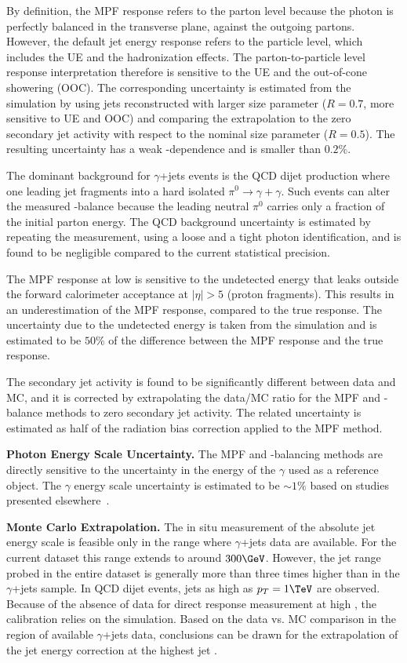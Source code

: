By definition, the MPF response refers to the parton level because the photon is perfectly balanced in the transverse plane, against the outgoing partons. However, the default jet energy response refers to the particle level, which includes the UE and the hadronization effects. The parton-to-particle level response interpretation therefore is sensitive to the UE and the out-of-cone showering (OOC). The corresponding uncertainty is estimated from the simulation by using jets reconstructed with larger size parameter ($R=0.7$, more sensitive to UE and OOC) and comparing the extrapolation to the zero secondary jet activity with respect to the nominal size parameter ($R=0.5$). The resulting uncertainty has a weak \pt-dependence and is smaller than $0.2\%$. 

The dominant background for $\gamma$+jets events is the QCD dijet production where one leading jet fragments into a hard isolated $\pi^0\to\gamma+\gamma$. Such events can alter the measured \pt-balance because the leading neutral $\pi^0$ carries only a fraction of the initial parton energy. The QCD background uncertainty is estimated by repeating the measurement, using a loose and a tight photon identification, and is found to be negligible compared to the current statistical precision.

The MPF response at low \pt is sensitive to the undetected energy that leaks outside the forward calorimeter acceptance at $|\eta|>5$ (proton fragments). This results in an underestimation of the MPF response, compared to the true response. The uncertainty due to the undetected energy is taken from the simulation and is estimated to be $50\%$ of the difference between the MPF response and the true response. 

The secondary jet activity is found to be significantly different between data and MC, and it is corrected by extrapolating the data/MC ratio for the MPF and \pt-balance methods to zero secondary jet activity. The related uncertainty is estimated as half of the radiation bias correction applied to the MPF method.

{\bf Photon Energy Scale Uncertainty.} The MPF and \pt-balancing methods are directly sensitive to the uncertainty in the energy of the $\gamma$ used as a reference object. The $\gamma$ energy scale uncertainty is estimated to be $\sim 1\%$ based on studies presented elsewhere~\cite{EGM-10-003}.

{\bf Monte Carlo Extrapolation.} The in situ measurement of the absolute jet energy scale is feasible only in the \pt range where $\gamma$+jets data are available. For the current dataset this range extends to around $300\GeV$. However, the jet \pt range probed in the entire dataset is generally more than three times higher than in the $\gamma$+jets sample. In QCD dijet events, jets as high as $\pt = 1\TeV$ are observed. Because of the absence of data for direct response measurement at high \pt, the calibration relies on the simulation. Based on the data vs. MC comparison in the region of available $\gamma$+jets data, conclusions can be drawn for the extrapolation of the jet energy correction at the highest jet \pt.

